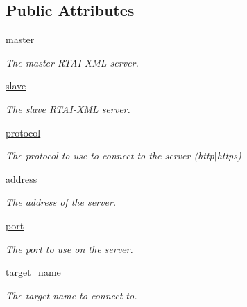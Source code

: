 \subsection*{\-Public \-Attributes}
\begin{DoxyCompactItemize}
\item 
\hyperlink{classpyrtai_1_1rtai__server_1_1_rtai_server_a21c21afe6f0d580bcbe5f3dff9b5b2db}{master}
\begin{DoxyCompactList}\small\item\em \-The master \-R\-T\-A\-I-\/\-X\-M\-L server. \end{DoxyCompactList}\item 
\hyperlink{classpyrtai_1_1rtai__server_1_1_rtai_server_a5ba04b29d8f31daf8ad004d755f35c2c}{slave}
\begin{DoxyCompactList}\small\item\em \-The slave \-R\-T\-A\-I-\/\-X\-M\-L server. \end{DoxyCompactList}\item 
\hyperlink{classpyrtai_1_1rtai__server_1_1_rtai_server_a73a84c2d529fa4c391b063a12f3e728c}{protocol}
\begin{DoxyCompactList}\small\item\em \-The protocol to use to connect to the server (http$|$https) \end{DoxyCompactList}\item 
\hyperlink{classpyrtai_1_1rtai__server_1_1_rtai_server_a2353509bf09ba99d461716173f876fcf}{address}
\begin{DoxyCompactList}\small\item\em \-The address of the server. \end{DoxyCompactList}\item 
\hyperlink{classpyrtai_1_1rtai__server_1_1_rtai_server_a37a7acb27c10fbdb822e2dadc8284908}{port}
\begin{DoxyCompactList}\small\item\em \-The port to use on the server. \end{DoxyCompactList}\item 
\hyperlink{classpyrtai_1_1rtai__server_1_1_rtai_server_af609c8237aab35aeec077d8e198dbf4d}{target\-\_\-name}
\begin{DoxyCompactList}\small\item\em \-The target name to connect to. \end{DoxyCompactList}\end{DoxyCompactItemize}


